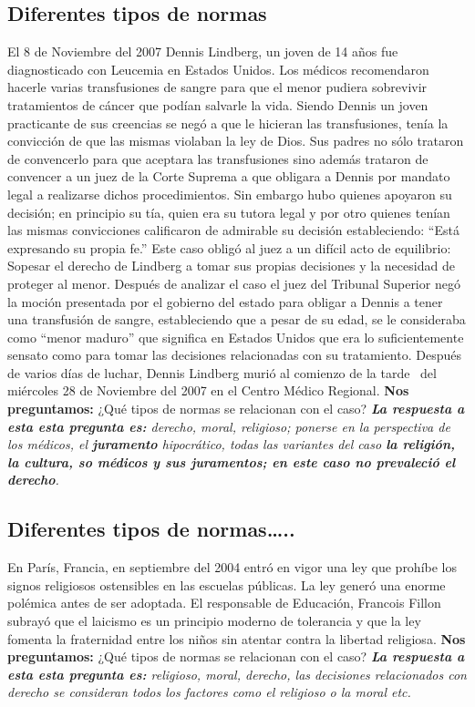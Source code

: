 \subsection{Diferentes tipos de normas}
El 8 de Noviembre del 2007 Dennis Lindberg, un joven de 14 años fue diagnosticado con Leucemia en Estados Unidos. Los médicos recomendaron hacerle varias transfusiones de sangre para que el menor pudiera sobrevivir tratamientos de cáncer que podían salvarle la vida.
Siendo Dennis un joven practicante de sus creencias se negó a que le hicieran las transfusiones, tenía la convicción de que las mismas violaban la ley de Dios. 
Sus padres no sólo trataron de convencerlo para que aceptara las transfusiones sino además trataron de convencer a un juez de la Corte Suprema a que obligara a Dennis por mandato legal a realizarse dichos procedimientos.
Sin embargo hubo quienes apoyaron su decisión; en principio su tía, quien era su tutora legal y por otro quienes tenían las mismas convicciones calificaron de admirable su decisión estableciendo: “Está expresando su propia fe.” 
Este caso obligó al juez a un difícil acto de equilibrio: Sopesar el derecho de Lindberg a tomar sus propias decisiones y la necesidad de proteger al menor. Después de analizar el caso el  juez del Tribunal Superior negó la moción presentada por el gobierno del estado para obligar a Dennis a tener una transfusión de sangre, estableciendo que a pesar de su edad, se le consideraba como “menor maduro” que significa en Estados Unidos que era lo suficientemente sensato como para tomar las decisiones relacionadas con su tratamiento. 
Después de varios días de luchar, Dennis Lindberg murió al comienzo de la tarde  del miércoles  28 de Noviembre del 2007 en  el Centro Médico Regional.
\newline 
\textbf{Nos preguntamos:} ¿Qué tipos de normas  se relacionan con el caso? \emph{\textbf{La respuesta a esta esta pregunta es: }derecho, moral, religioso; ponerse en la perspectiva de los médicos, el \textbf{juramento} hipocrático, todas las variantes del caso \textbf{la religión, la cultura, so médicos y sus juramentos; en este caso no prevaleció el derecho}.}


\subsection{Diferentes tipos de normas…..}  
En París, Francia, en septiembre del 2004 entró en vigor una ley que prohíbe los signos religiosos ostensibles en las escuelas públicas. La ley generó una enorme polémica antes de ser adoptada. El responsable de Educación, Francois Fillon subrayó que el laicismo es un principio moderno de tolerancia y que la ley fomenta la fraternidad entre los niños sin atentar contra la libertad religiosa. 
\newline 
\textbf{Nos preguntamos:} ¿Qué tipos de normas  se relacionan con el caso? \emph{\textbf{La respuesta a esta esta pregunta es: }religioso, moral, derecho, las decisiones relacionados con derecho se consideran todos los factores como el religioso o la moral etc.}


